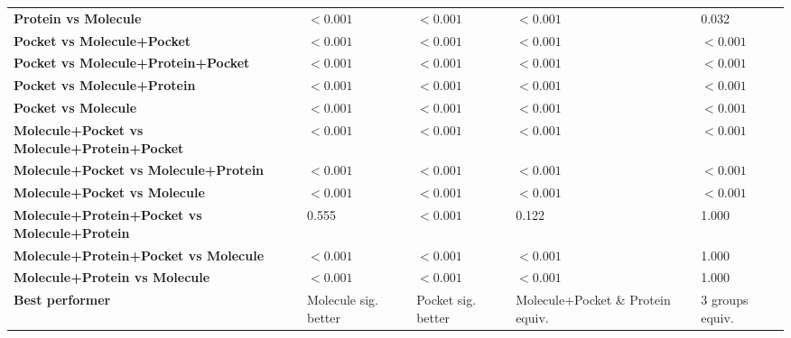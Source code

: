 \begin{table}[H]
{\begin{tabular}{lllll}
        \textbf{Protein vs Molecule} & $< 0.001$ & $< 0.001$ & $< 0.001$ & 0.032 \\
        \textbf{Pocket vs Molecule+Pocket} & $< 0.001$ & $< 0.001$ & $< 0.001$ & $< 0.001$ \\
        \textbf{Pocket vs Molecule+Protein+Pocket} & $< 0.001$ & $< 0.001$ & $< 0.001$ & $< 0.001$ \\
        \textbf{Pocket vs Molecule+Protein} & $< 0.001$ & $< 0.001$ & $< 0.001$ & $< 0.001$ \\
        \textbf{Pocket vs Molecule} & $< 0.001$ & $< 0.001$ & $< 0.001$ & $< 0.001$ \\
        \textbf{Molecule+Pocket vs Molecule+Protein+Pocket} & $< 0.001$ & $< 0.001$ & $< 0.001$ & $< 0.001$ \\
        \textbf{Molecule+Pocket vs Molecule+Protein} & $< 0.001$ & $< 0.001$ & $< 0.001$ & $< 0.001$ \\
        \textbf{Molecule+Pocket vs Molecule} & $< 0.001$ & $< 0.001$ & $< 0.001$ & $< 0.001$ \\
        \textbf{Molecule+Protein+Pocket vs Molecule+Protein} & 0.555 & $< 0.001$ & 0.122 & 1.000 \\
        \textbf{Molecule+Protein+Pocket vs Molecule} & $< 0.001$ & $< 0.001$ & $< 0.001$ & 1.000 \\
        \textbf{Molecule+Protein vs Molecule} & $< 0.001$ & $< 0.001$ & $< 0.001$ & 1.000 \\
        \textbf{Best performer} & Molecule sig. better & Pocket sig. better & Molecule+Pocket \& Protein equiv. & 3 groups equiv. \\
        \bottomrule
    \end{tabular}}
\end{table}